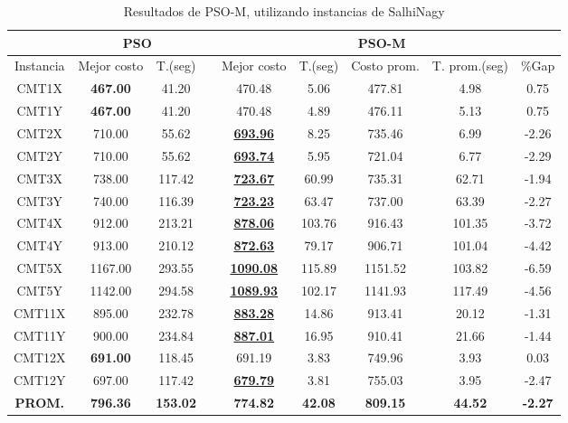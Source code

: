 \begin{table}[h]
\caption{ Resultados de PSO-M, utilizando instancias de SalhiNagy}
\centering
\scriptsize
\begin{tabular*}{1.00\textwidth}{@{\extracolsep{\fill}} |c||c c||c c c c c c|}
\hline
 & \multicolumn{2}{c||}{\bf{PSO}} & \multicolumn{6}{c|}{\bf{PSO-M}}\\\hline
Instancia & Mejor costo & T.(seg) & & Mejor costo & T.(seg) & Costo prom. & T. prom.(seg) & \%Gap\\ [0.5ex]
\hline\hline
CMT1X & \bf{467.00} & 41.20 & & 
470.48 & 5.06 & 477.81 & 4.98 & 0.75\\CMT1Y & \bf{467.00} & 41.20 & & 
470.48 & 4.89 & 476.11 & 5.13 & 0.75\\CMT2X & 710.00 & 55.62 & & \bf{\underline{693.96}} & 
8.25 & 735.46 & 6.99 & -2.26\\CMT2Y & 710.00 & 55.62 & & \bf{\underline{693.74}} & 
5.95 & 721.04 & 6.77 & -2.29\\CMT3X & 738.00 & 117.42 & & \bf{\underline{723.67}} & 
60.99 & 735.31 & 62.71 & -1.94\\CMT3Y & 740.00 & 116.39 & & \bf{\underline{723.23}} & 
63.47 & 737.00 & 63.39 & -2.27\\CMT4X & 912.00 & 213.21 & & \bf{\underline{878.06}} & 
103.76 & 916.43 & 101.35 & -3.72\\CMT4Y & 913.00 & 210.12 & & \bf{\underline{872.63}} & 
79.17 & 906.71 & 101.04 & -4.42\\CMT5X & 1167.00 & 293.55 & & \bf{\underline{1090.08}} & 
115.89 & 1151.52 & 103.82 & -6.59\\CMT5Y & 1142.00 & 294.58 & & \bf{\underline{1089.93}} & 
102.17 & 1141.93 & 117.49 & -4.56\\CMT11X & 895.00 & 232.78 & & \bf{\underline{883.28}} & 
14.86 & 913.41 & 20.12 & -1.31\\CMT11Y & 900.00 & 234.84 & & \bf{\underline{887.01}} & 
16.95 & 910.41 & 21.66 & -1.44\\CMT12X & \bf{691.00} & 118.45 & & 
691.19 & 3.83 & 749.96 & 3.93 & 0.03\\CMT12Y & 697.00 & 117.42 & & \bf{\underline{679.79}} & 
3.81 & 755.03 & 3.95 & -2.47\\\hline\hline\bf{PROM.} & 
\bf{796.36} & \bf{153.02} & & \bf{774.82} & \bf{42.08} & \bf{809.15} & \bf{44.52} & \bf{-2.27}\\[1ex]\hline
\end{tabular*}
\label{table:pso-finalS}
\end{table}


